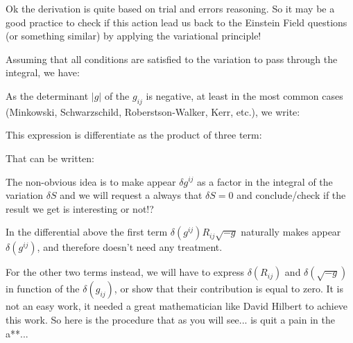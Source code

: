 	Ok the derivation is quite based on trial and errors reasoning. So it may be a good practice to check if this action lead us back to the Einstein Field questions (or something similar) by applying the variational principle!
	
	Assuming that all conditions are satisfied to the variation to pass through the integral, we have:
	
	As the determinant $|g|$ of the $g_{ij}$ is negative, at least in the most common cases (Minkowski, Schwarzschild, Roberstson-Walker, Kerr, etc.), we write:
	
	This expression is differentiate as the product of three term:
	
	That can be written:
	
	The non-obvious idea is to make appear $\delta g^{ij}$ as a factor in the integral of the variation $\delta S$ and we will request a always that $\delta S=0$ and conclude/check if the result we get is interesting or not!?
	
	In the differential above the first term $\delta(g^{ij})R_{ij}\sqrt{-g}$ naturally makes appear $\delta(g^{ij})$, and therefore doesn't need any treatment.
	
	For the other two terms instead, we will have to express $\delta(R_{ij})$ and $\delta (\sqrt{-g})$ in function of the $\delta (g_{ij})$, or show that their contribution is equal to zero. It is not an easy work, it needed a great mathematician like David Hilbert to achieve this work. So here is the procedure that as you will see... is quit a pain in the a**...
	
